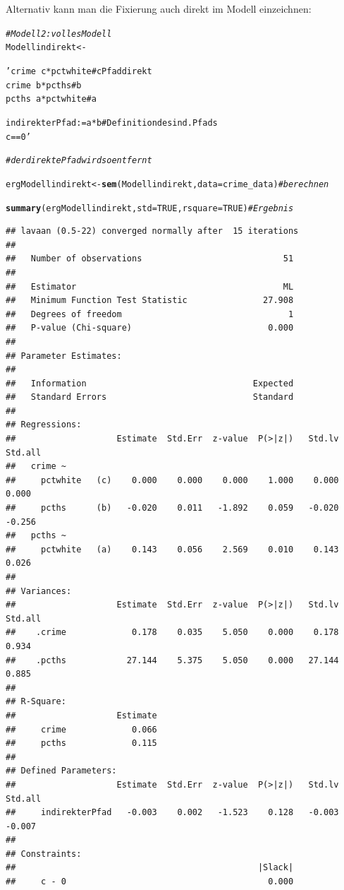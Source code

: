 \documentclass[a4paper]{article}\usepackage[]{graphicx}\usepackage[]{color}
\makeatletter
\newcommand{\hlnum}[1]{\textcolor[rgb]{0.686,0.059,0.569}{#1}}%
\newcommand{\hlstr}[1]{\textcolor[rgb]{0.192,0.494,0.8}{#1}}%
\newcommand{\hlcom}[1]{\textcolor[rgb]{0.678,0.584,0.686}{\textit{#1}}}%
\newcommand{\hlstd}[1]{\textcolor[rgb]{0.345,0.345,0.345}{#1}}%
\newcommand{\hlkwb}[1]{\textcolor[rgb]{0.69,0.353,0.396}{#1}}%
\newcommand{\hlkwc}[1]{\textcolor[rgb]{0.333,0.667,0.333}{#1}}%
\newcommand{\hlkwd}[1]{\textcolor[rgb]{0.737,0.353,0.396}{\textbf{#1}}}%
\newenvironment{kframe}{%
 \def\at@end@of@kframe{}%
 \ifinner\ifhmode%
  \def\at@end@of@kframe{\end{minipage}}%
  \begin{minipage}{\columnwidth}%
 \fi\fi%
 \def\FrameCommand##1{\hskip\@totalleftmargin \hskip-\fboxsep
 \colorbox{shadecolor}{##1}\hskip-\fboxsep
     \hskip-\linewidth \hskip-\@totalleftmargin \hskip\columnwidth}%
 \MakeFramed {\advance\hsize-\width
   \@totalleftmargin\z@ \linewidth\hsize
   \@setminipage}}%
 {\par\unskip\endMakeFramed%
 \at@end@of@kframe}
\newenvironment{knitrout}{}{} %
\makeatother
\begin{document}
Alternativ kann man die Fixierung auch direkt im Modell einzeichnen:
\begin{knitrout}
\color{fgcolor}\begin{kframe}
\begin{alltt}
\hlcom{# Modell 2: volles Modell}
\hlstd{Modellindirekt} \hlkwb{<-} \hlstr{'crime ~ c*pctwhite # c Pfad direkt
               crime ~ b*pcths # b
               pcths ~ a*pctwhite # a

               indirekterPfad := a*b # Definition des ind. Pfads
               c==0'} \hlcom{# der direkte Pfad wird so entfernt}

\hlstd{ergModellindirekt} \hlkwb{<-} \hlkwd{sem}\hlstd{(Modellindirekt,} \hlkwc{data} \hlstd{= crime_data)} \hlcom{# berechnen}

\hlkwd{summary}\hlstd{(ergModellindirekt,} \hlkwc{std}\hlstd{=}\hlnum{TRUE}\hlstd{,} \hlkwc{rsquare}\hlstd{=}\hlnum{TRUE}\hlstd{)} \hlcom{# Ergebnis}
\end{alltt}
\begin{verbatim}
## lavaan (0.5-22) converged normally after  15 iterations
## 
##   Number of observations                            51
## 
##   Estimator                                         ML
##   Minimum Function Test Statistic               27.908
##   Degrees of freedom                                 1
##   P-value (Chi-square)                           0.000
## 
## Parameter Estimates:
## 
##   Information                                 Expected
##   Standard Errors                             Standard
## 
## Regressions:
##                    Estimate  Std.Err  z-value  P(>|z|)   Std.lv  Std.all
##   crime ~                                                               
##     pctwhite   (c)    0.000    0.000    0.000    1.000    0.000    0.000
##     pcths      (b)   -0.020    0.011   -1.892    0.059   -0.020   -0.256
##   pcths ~                                                               
##     pctwhite   (a)    0.143    0.056    2.569    0.010    0.143    0.026
## 
## Variances:
##                    Estimate  Std.Err  z-value  P(>|z|)   Std.lv  Std.all
##    .crime             0.178    0.035    5.050    0.000    0.178    0.934
##    .pcths            27.144    5.375    5.050    0.000   27.144    0.885
## 
## R-Square:
##                    Estimate
##     crime             0.066
##     pcths             0.115
## 
## Defined Parameters:
##                    Estimate  Std.Err  z-value  P(>|z|)   Std.lv  Std.all
##     indirekterPfad   -0.003    0.002   -1.523    0.128   -0.003   -0.007
## 
## Constraints:
##                                                |Slack|
##     c - 0                                        0.000
\end{verbatim}
\end{kframe}
\end{knitrout}
\end{document}
